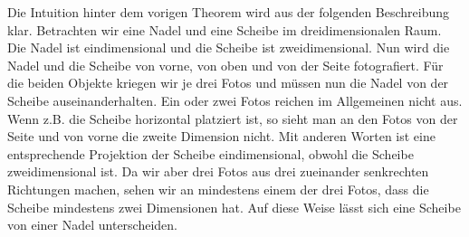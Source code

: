\begin{bsp}
	Die Intuition hinter dem vorigen Theorem wird aus der folgenden Beschreibung klar. Betrachten wir eine Nadel und eine Scheibe im dreidimensionalen Raum. Die Nadel ist eindimensional und die Scheibe ist zweidimensional. Nun wird die Nadel und die Scheibe von vorne, von oben und von der Seite fotografiert. Für die beiden Objekte kriegen wir je drei Fotos und müssen nun die Nadel von der Scheibe auseinanderhalten. Ein oder zwei Fotos reichen im Allgemeinen nicht aus. Wenn z.B. die Scheibe horizontal platziert ist, so sieht man an den Fotos von der Seite und von vorne die zweite Dimension nicht. Mit anderen Worten ist eine entsprechende Projektion der Scheibe eindimensional, obwohl die Scheibe zweidimensional ist. Da wir aber drei Fotos aus drei zueinander senkrechten Richtungen machen, sehen wir an mindestens einem der drei Fotos, dass die Scheibe mindestens zwei Dimensionen hat. Auf diese Weise lässt sich eine Scheibe von einer Nadel unterscheiden. 
	

\end{bsp}
